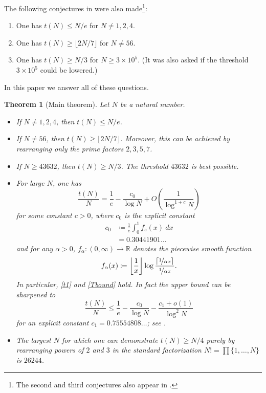 \documentclass[10pt,a4paper,reqno]{amsart}
\numberwithin{equation}{section}
\theoremstyle{plain}
\newtheorem{theorem}{Theorem}[section]
\theoremstyle{definition}
\newcommand\R{\mathbb{R}}
\begin{document}
The following conjectures in \cite{guy-selfridge} were also made\footnote{The second and third conjectures also appear in \cite{guy}.}:
\begin{enumerate}
\item One has $t(N) \leq N/e$ for $N \neq 1,2,4$.
\item One has $t(N) \geq \lfloor 2N/7 \rfloor$ for $N \neq 56$.
\item One has $t(N) \geq N/3$ for $N \geq 3 \times 10^5$.  (It was also asked if the threshold $3 \times 10^5$ could be lowered.) 
\end{enumerate}

In this paper we answer all of these questions.

\begin{theorem}[Main theorem]\label{main} Let $N$ be a natural number.
\begin{itemize}
\item[(i)] If $N \neq 1,2,4$, then $t(N) \leq N/e$.
\item[(ii)]  If $N \neq 56$, then $t(N) \geq \lfloor 2N/7 \rfloor$.  Moreover, this can be achieved by rearranging only the prime factors $2,3,5,7$.
\item[(iii)]  If $N \geq 43632$, then $t(N) \geq N/3$.  The threshold $43632$ is best possible.
\item[(iv)]  For large $N$, one has
  \begin{equation}\label{asym}
    \frac{t(N)}{N} = \frac{1}{e} - \frac{c_0}{\log N} + O\left( \frac{1}{\log^{1+c} N} \right)
  \end{equation}
for some constant $c>0$, where $c_0$ is the explicit constant
\begin{equation}\label{c0-def}
  \begin{split}
  c_0 &\coloneqq \frac{1}{e} \int_0^1 f_e(x)\ dx \\
  &= 0.30441901\dots
\end{split}
\end{equation}
and for any $\alpha>0$, $f_\alpha \colon (0,\infty) \to \R$ denotes the piecewise smooth function
\begin{equation}\label{falpha-def} 
  f_\alpha(x) \coloneqq \left\lfloor \frac{1}{x} \right\rfloor \log \frac{\lceil \nicefrac{1}{\alpha x} \rceil}{\nicefrac{1}{\alpha x}}.
\end{equation}
In particular, \eqref{t1} and \eqref{Tbound} hold.  In fact the upper bound can be sharpened to
\begin{equation}\label{tna} 
  \frac{t(N)}{N} \leq \frac{1}{e} - \frac{c_0}{\log N} - \frac{c_1+o(1)}{\log^2 N} 
\end{equation}
for an explicit constant $c_1=0.75554808\dots$; see .
\item[(v)]  The largest $N$ for which one can demonstrate $t(N) \geq N/4$ purely by rearranging powers of $2$ and $3$ in the standard factorization $N! = \prod \{1,\dots,N\}$ is $26244$.
\end{itemize}
\end{theorem}
\end{document}
